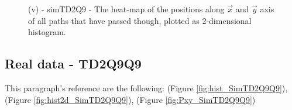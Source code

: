 \documentclass[class=article, crop=false]{standalone}
\begin{document}
\begin{figure}[!htb]
    \centering
        \quad\quad
    \caption{(v) - simTD2Q9 - The heat-map of the positions along $\vec x$ and $\vec y$ axis of all paths that have passed though, plotted as 2-dimensional histogram.}
    \label{fig:Pxy_SimTD2Q9}
\end{figure}


\FloatBarrier
\subsection{Real data - TD2Q9Q9}
This paragraph's reference are the following: (Figure \ref{fig:hist_SimTD2Q9Q9}), (Figure \ref{fig:hist2d_SimTD2Q9Q9}), (Figure \ref{fig:Pxy_SimTD2Q9Q9}) 
\end{document}
